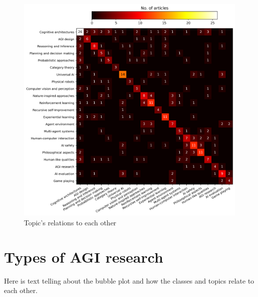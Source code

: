 \documentclass[utf8,english]{gradu3}
\begin{document}
\begin{figure}[H]
  \centering
  \includegraphics[scale=0.65]{material/data/topic_heatmap_no_zeroes.png}
  \caption{Topic's relations to each other}
  \label{fig:topicheat}
\end{figure}


\section{Types of AGI research}

Here is text telling about the bubble plot and how the classes and topics relate
to each other.
\end{document}
